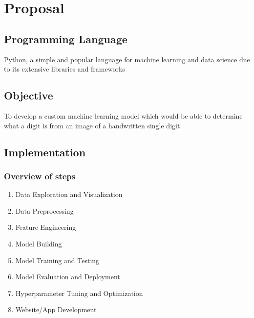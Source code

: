\documentclass{notes}
\begin{document}

\vspace{-\baselineskip}
\vspace{-\baselineskip}

\section{Proposal}

\subsection{Programming Language}
Python, a simple and popular language for machine learning and data science due to its extensive libraries and frameworks

\subsection{Objective}
To develop a custom machine learning model which would be able to determine what a digit is from an image of a handwritten single digit

\subsection{Implementation}

\subsubsection{Overview of steps}
\begin{enumerate}
    \item Data Exploration and Visualization
    \item Data Preprocessing
    \item Feature Engineering
    \item Model Building
    \item Model Training and Testing
    \item Model Evaluation and Deployment
    \item Hyperparameter Tuning and Optimization
    \item Website/App Development
\end{enumerate}
\end{document}
